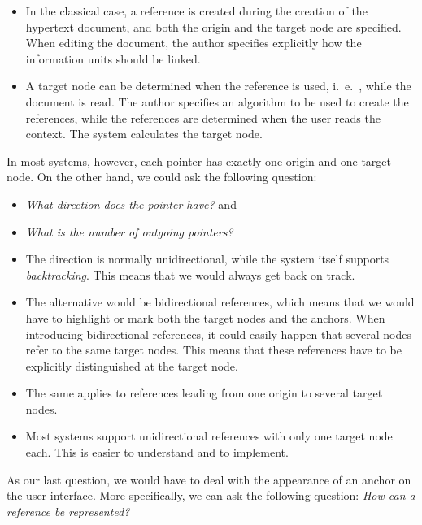 \begin{multicols}{2}
	\begin{itemize}
		\item In the classical case, a reference is created during the creation of the hypertext document, and both the origin and the target node are specified. When editing the	document, the author specifies explicitly how the information units should be
		linked.
		
		\item A target node can be determined when the reference is used, i.\ e.\ , while the document is read. The author specifies an algorithm to be used to create the references, while the references are determined when the user reads the context. The system 	calculates the target node.
	\end{itemize}
\end{multicols}

In most systems, however, each pointer has exactly one origin and one target node. On the other hand, we could ask the following question:
\begin{itemize}
	\item \textit{ What direction does the pointer have?} and
	\item \textit{What is the number of outgoing pointers?}
\end{itemize}


\begin{multicols}{2}
	\begin{itemize}
		\item The direction is normally unidirectional, while the system itself supports \textit{backtracking}. This means that we would always get back on track.
		\item The alternative would be bidirectional references, which means that we would have to highlight or mark both the target nodes and the anchors. When introducing bidirectional references, it could easily happen that several nodes refer to the same target nodes. This means that these references have to be explicitly distinguished at the target node.
		\item The same applies to references leading from one origin to several target nodes.
		\item Most systems support unidirectional references with only one target node each. This is easier to understand and to implement.
	\end{itemize}
\end{multicols}

As our last question, we would have to deal with the appearance of an anchor on the user interface. More specifically, we can ask the following question: \textit{How can a reference be represented?}

